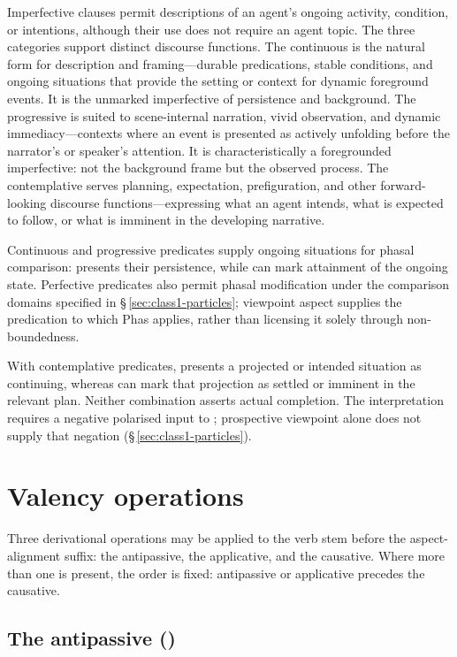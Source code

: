 Imperfective clauses permit descriptions of an agent's ongoing activity,
condition, or intentions, although their use does not require an agent topic.
The three categories support distinct discourse functions. The continuous is the natural form for description and
framing---durable predications, stable conditions, and ongoing situations that
provide the setting or context for dynamic foreground events. It is the unmarked
imperfective of persistence and background. The progressive is suited to
scene-internal narration, vivid observation, and dynamic immediacy---contexts
where an event is presented as actively unfolding before the narrator's or
speaker's attention. It is characteristically a foregrounded imperfective: not
the background frame but the observed process. The contemplative serves
planning, expectation, prefiguration, and other forward-looking discourse
functions---expressing what an agent intends, what is expected to follow, or
what is imminent in the developing narrative.

Continuous and progressive predicates supply ongoing situations for phasal
comparison:  presents their persistence, while  can mark
attainment of the ongoing state. Perfective predicates also permit phasal
modification under the comparison domains specified in
§\,\ref{sec:class1-particles}; viewpoint aspect supplies the predication
to which Phas applies, rather than licensing it solely through
non-boundedness.

With contemplative predicates,  presents a projected or intended
situation as continuing, whereas  can mark that projection as
settled or imminent in the relevant plan. Neither combination asserts actual
completion. The  interpretation requires a negative polarised
input to ; prospective viewpoint alone does not supply that negation
(§\,\ref{sec:class1-particles}).

\section{Valency operations}

Three derivational operations may be applied to the verb stem before the
aspect-alignment suffix: the antipassive, the applicative, and the causative.
Where more than one is present, the order is fixed: antipassive or applicative
precedes the causative.

\subsection{The antipassive ()}
\label{sec:vm-antipassive-desc}\label{sec:vm-antipassive}

